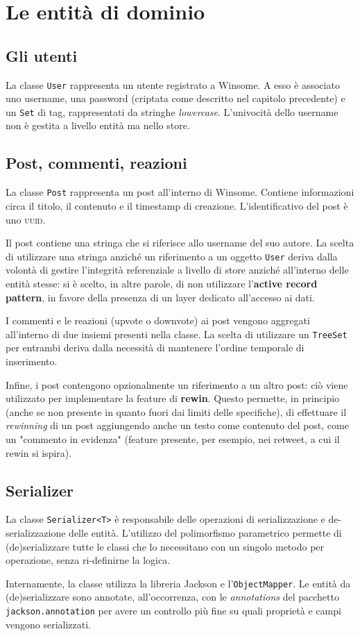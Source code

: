 \documentclass[a4paper,8pt]{article} %
\def\code#1{\texttt{#1}}
\begin{document}
\section{Le entità di dominio}
\subsection{Gli utenti}
La classe \code{User} rappresenta un utente registrato a Winsome. A esso è associato uno username, una password (criptata come descritto nel capitolo precedente) e un \code{Set} di tag,
rappresentati da stringhe \emph{lowercase}. L'univocità dello username non è gestita a livello entità ma nello store.
\subsection{Post, commenti, reazioni}
La classe \code{Post} rappresenta un post all'interno di Winsome. Contiene informazioni circa il titolo, il contenuto e il timestamp di creazione. L'identificativo del post è uno \textsc{uuid}.
\par Il post contiene una stringa che si riferisce allo username del suo autore. La scelta di utilizzare una stringa anziché un riferimento a un oggetto \code{User} deriva dalla volontà
di gestire l'integrità referenziale a livello di store anziché all'interno delle entità stesse: si è scelto, in altre parole, di non utilizzare l'\textbf{active record pattern}, in favore
della presenza di un layer dedicato all'accesso ai dati.
\par I commenti e le reazioni (upvote o downvote) ai post vengono aggregati all'interno di due insiemi presenti nella classe. La scelta di utilizzare un \code{TreeSet} per entrambi deriva
dalla necessità di mantenere l'ordine temporale di inserimento.
\par Infine, i post contengono opzionalmente un riferimento a un altro post: ciò viene utilizzato per implementare la feature di \textbf{rewin}. Questo permette, in principio (anche se non
presente in quanto fuori dai limiti delle specifiche), di effettuare il \emph{rewinning} di un post aggiungendo anche un testo come contenuto del post, come un "commento in evidenza" (feature presente,
per esempio, nei retweet, a cui il rewin si ispira).
\subsection{Serializer}
La classe \code{Serializer<T>} è responsabile delle operazioni di serializzazione e de-serializzazione delle entità.
L'utilizzo del polimorfismo parametrico permette di (de)serializzare tutte le classi che lo necessitano con un singolo metodo per operazione, senza ri-definirne
la logica.
\par Internamente, la classe utilizza la libreria Jackson e l'\code{ObjectMapper}. Le entità da (de)serializzare sono annotate, all'occorrenza, con le \emph{annotations} del pacchetto
\code{jackson.annotation} per avere un controllo più fine su quali proprietà e campi vengono serializzati.
\end{document}
